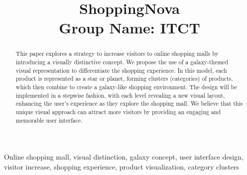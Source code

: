 \documentclass[conference]{IEEEtran}
\begin{document}
\sloppy

\title{ShoppingNova\\
{\footnotesize Group Name: ITCT}
}

\author{
\and
{}
\and
{}
\and
{}
}

\maketitle

\begin{abstract}This paper explores a strategy to increase visitors to online shopping malls by introducing a visually distinctive concept. We propose the use of a galaxy-themed visual representation to differentiate the shopping experience. In this model, each product is represented as a star or planet, forming clusters (categories) of products, which then combine to create a galaxy-like shopping environment. The design will be implemented in a stepwise fashion, with each level revealing a new visual layout, enhancing the user's experience as they explore the shopping mall. We believe that this unique visual approach can attract more visitors by providing an engaging and memorable user interface.
\end{abstract}

\begin{IEEEkeywords}
Online shopping mall, visual distinction, galaxy concept, user interface design, visitor increase, shopping experience, product visualization, category clusters
\end{IEEEkeywords}
\end{document}
